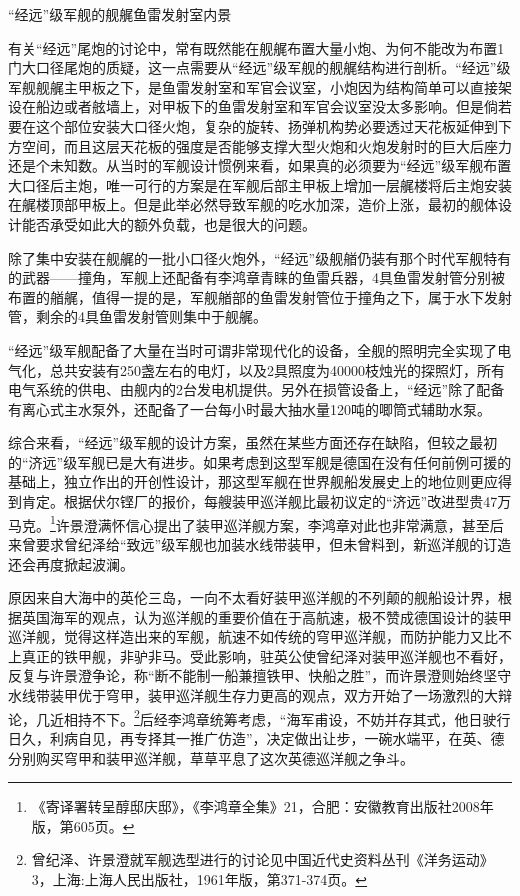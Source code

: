 \documentclass[12pt,UTF8]{ctexbook}
\begin{document}
“经远”级军舰的舰艉鱼雷发射室内景

有关“经远”尾炮的讨论中，常有既然能在舰艉布置大量小炮、为何不能改为布置1门大口径尾炮的质疑，这一点需要从“经远”级军舰的舰艉结构进行剖析。“经远”级军舰舰艉主甲板之下，是鱼雷发射室和军官会议室，小炮因为结构简单可以直接架设在船边或者舷墙上，对甲板下的鱼雷发射室和军官会议室没太多影响。但是倘若要在这个部位安装大口径火炮，复杂的旋转、扬弹机构势必要透过天花板延伸到下方空间，而且这层天花板的强度是否能够支撑大型火炮和火炮发射时的巨大后座力还是个未知数。从当时的军舰设计惯例来看，如果真的必须要为“经远”级军舰布置大口径后主炮，唯一可行的方案是在军舰后部主甲板上增加一层艉楼将后主炮安装在艉楼顶部甲板上。但是此举必然导致军舰的吃水加深，造价上涨，最初的舰体设计能否承受如此大的额外负载，也是很大的问题。

除了集中安装在舰艉的一批小口径火炮外，“经远”级舰艏仍装有那个时代军舰特有的武器——撞角，军舰上还配备有李鸿章青睐的鱼雷兵器，4具鱼雷发射管分别被布置的艏艉，值得一提的是，军舰艏部的鱼雷发射管位于撞角之下，属于水下发射管，剩余的4具鱼雷发射管则集中于舰艉。

“经远”级军舰配备了大量在当时可谓非常现代化的设备，全舰的照明完全实现了电气化，总共安装有250盏左右的电灯，以及2具照度为40000枝烛光的探照灯，所有电气系统的供电、由舰内的2台发电机提供。另外在损管设备上，“经远”除了配备有离心式主水泵外，还配备了一台每小时最大抽水量120吨的唧筒式辅助水泵。

综合来看，“经远”级军舰的设计方案，虽然在某些方面还存在缺陷，但较之最初的“济远”级军舰已是大有进步。如果考虑到这型军舰是德国在没有任何前例可援的基础上，独立作出的开创性设计，那这型军舰在世界舰船发展史上的地位则更应得到肯定。根据伏尔铿厂的报价，每艘装甲巡洋舰比最初议定的“济远”改进型贵47万马克。\footnote{《寄译署转呈醇邸庆邸》，《李鸿章全集》21，合肥：安徽教育出版社2008年版，第605页。}许景澄满怀信心提出了装甲巡洋舰方案，李鸿章对此也非常满意，甚至后来曾要求曾纪泽给“致远”级军舰也加装水线带装甲，但未曾料到，新巡洋舰的订造还会再度掀起波澜。

原因来自大海中的英伦三岛，一向不太看好装甲巡洋舰的不列颠的舰船设计界，根据英国海军的观点，认为巡洋舰的重要价值在于高航速，极不赞成德国设计的装甲巡洋舰，觉得这样造出来的军舰，航速不如传统的穹甲巡洋舰，而防护能力又比不上真正的铁甲舰，非驴非马。受此影响，驻英公使曾纪泽对装甲巡洋舰也不看好，反复与许景澄争论，称“断不能制一船兼擅铁甲、快船之胜”，而许景澄则始终坚守水线带装甲优于穹甲，装甲巡洋舰生存力更高的观点，双方开始了一场激烈的大辩论，几近相持不下。\footnote{曾纪泽、许景澄就军舰选型进行的讨论见中国近代史资料丛刊《洋务运动》3，上海:上海人民出版社，1961年版，第371-374页。}后经李鸿章统筹考虑，“海军甫设，不妨并存其式，他日驶行日久，利病自见，再专择其一推广仿造”，决定做出让步，一碗水端平，在英、德分别购买穹甲和装甲巡洋舰，草草平息了这次英德巡洋舰之争斗。
\end{document}

